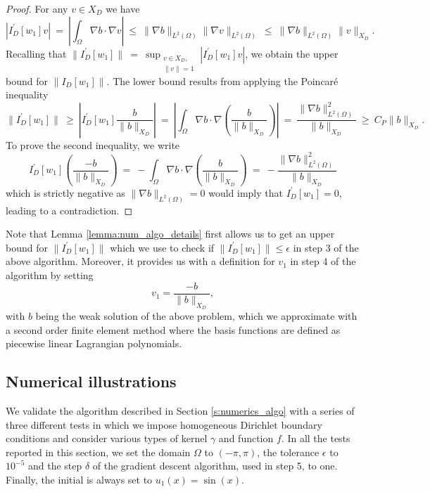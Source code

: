 \documentclass[11pt]{amsart}   	%
\theoremstyle{plain}
\numberwithin{equation}{section}
\begin{document}
\begin{proof}
For any $v\in X_D$ we have
$$ |I_D^\prime[w_1] v|
\ = \ \left|\int_\Omega \nabla b \cdot \nabla v\right|
\ \leq \ \|\nabla b \|_{L^2(\Omega)} \|\nabla v\|_{L^2(\Omega)}
\ \leq \ \| \nabla b\|_{L^2(\Omega)} \| v\|_{X_D}.$$ 
Recalling that $\|I_D^\prime[w_1]\| \ = \ \sup_{\substack{v \in X_D,\\ \|v\| =1}} |I_D^\prime[w_1] v|$, we obtain the upper bound for $\|I_D[w_1]\|$. The lower bound results from applying the Poincar\'e inequality
$$ \| I_D^\prime[w_1] \| 
\ \geq \ | I_D^\prime[w_1] \frac{b}{\|b\|_{X_D}} | 
\ = \ \left| \int_\Omega \nabla b \cdot \nabla\left(\frac{b}{\|b\|_{X_D}}\right) \right|
\ = \ \frac{\|\nabla b\|_{L^2(\Omega)}^2}{\| b\|_{X_D} }
\ \geq \ C_P \| b\|_{X_D}.
$$
To prove the second inequality, we write
$$I_D^\prime[w_1] \left( \frac{-b}{\|b\|_{X_D}}\right)
\ = \ - \int_\Omega \nabla b \cdot \nabla \left(\frac{b}{\|b\|_{X_D}}\right) 
\ = \ - \frac{\|\nabla b\|_{L^2(\Omega)}^2}{\|b\|_{X_D}}
$$
which is strictly negative as $\|\nabla b\|_{L^2(\Omega)}=0$ would imply that $I_D^\prime[w_1]=0$, leading to a contradiction.
\end{proof}

Note that Lemma \ref{lemma:num_algo_details} first allows us to get an upper bound for $\|I_D^\prime[w_1]\|$ which we use to check if $\|I_D^\prime[w_1]\| \leq \epsilon$ in step 3 of the above algorithm. Moreover, it provides us with a definition for $v_1$ in step 4 of the algorithm by setting
$$v_1 = \frac{-b}{\|b\|_{X_D}},$$
with $b$ being the weak solution of the above problem, which we approximate with a second order finite element method where the basis functions are defined as piecewise linear Lagrangian polynomials.

\subsection{Numerical illustrations}\label{s:numerics_results_old}

We validate the algorithm described in Section \ref{s:numerics_algo} with a series of three different tests in which we impose homogeneous Dirichlet boundary conditions and consider various types of kernel $\gamma$ and function $f$.
In all the tests reported in this section, we set the domain $\Omega$ to $(-\pi,\pi)$, the tolerance $\epsilon$ to $10^{-5}$ and the step $\delta$ of the gradient descent algorithm, used in step 5, to one. Finally, the initial is always set to $u_1(x)=\sin(x)$.
\end{document}
